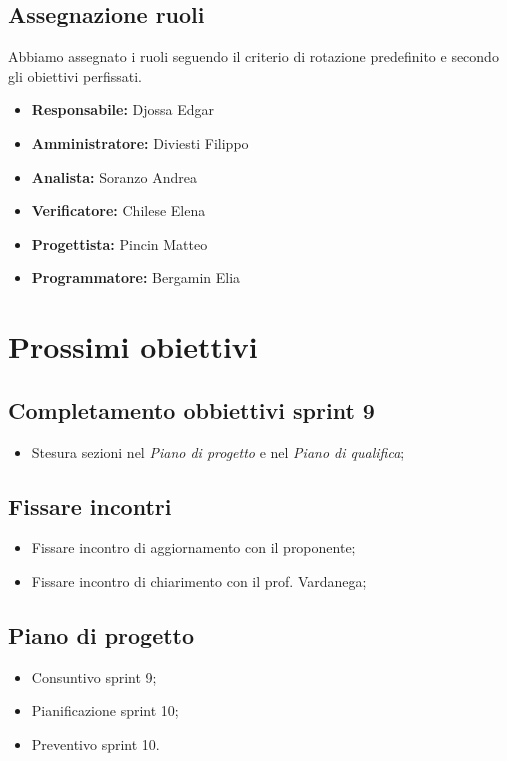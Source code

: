 \subsection{Assegnazione ruoli}
Abbiamo assegnato i ruoli seguendo il criterio di rotazione predefinito e secondo gli obiettivi perfissati.
\begin{itemize}
    \item \textbf{Responsabile:} Djossa Edgar
    \item \textbf{Amministratore:} Diviesti Filippo
    \item \textbf{Analista:} Soranzo Andrea
    \item \textbf{Verificatore:} Chilese Elena
    \item \textbf{Progettista:} Pincin Matteo
    \item \textbf{Programmatore:} Bergamin Elia
\end{itemize}

\section{Prossimi obiettivi}
\subsection{Completamento obbiettivi sprint 9}
\begin{itemize}
    \item Stesura sezioni nel \textit{Piano di progetto} e nel \textit{Piano di qualifica};
\end{itemize}

\subsection{Fissare incontri}
\begin{itemize}
    \item Fissare incontro di aggiornamento con il proponente;
    \item Fissare incontro di chiarimento con il prof. Vardanega; 
\end{itemize}

\subsection{Piano di progetto}
\begin{itemize}
    \item Consuntivo sprint 9;
    \item Pianificazione sprint 10;
    \item Preventivo sprint 10.
\end{itemize}

